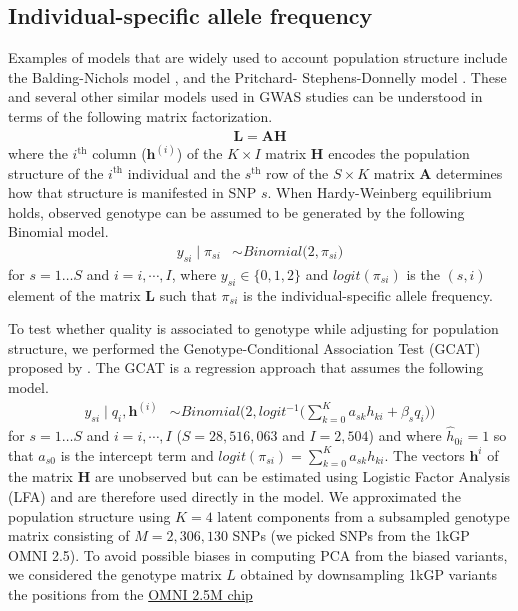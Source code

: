 \documentclass[9pt,lineno]{elife}
\begin{document}
\subsection{Individual-specific allele frequency}
Examples of models that are widely used to account population structure include the Balding-Nichols model \citep{balding1995method}, and the Pritchard- Stephens-Donnelly model \citep{pritchard2000inference}. 
These and several other similar models used in GWAS studies can be understood in terms of the following matrix factorization. 
\begin{align}
\mathbf{L }= \mathbf{AH}
\end{align} 
where the $i^\text{th}$ column ($\boldsymbol{h}^{(i)}$) of the $K \times I$ matrix $\mathbf{H}$ encodes the population structure of the $i^\text{th}$ individual and the $s^\text{th}$ row of the $S \times K$ matrix $\mathbf{A}$ determines how that structure is manifested in SNP $s$. 
When Hardy-Weinberg equilibrium holds, observed genotype can be assumed to be generated by the following Binomial model.
\begin{align} \label{lfa}
y_{si} \mid \pi_{si}  &\sim Binomial\big( 2, \pi_{si} \big) 
\end{align} 
for $s=1\hdots S$ and $i=i,\cdots, I$, where $y_{si} \in \{0,1,2\}$ and $logit(\pi_{si})$ is the $(s,i)$ element of the matrix $\mathbf{L}$ such that  $\pi_{si}$ is the individual-specific allele frequency.

To test whether quality is associated to genotype while adjusting for population structure, we performed the Genotype-Conditional Association Test  (GCAT) proposed by \citep{song2015testing}.
The GCAT is a regression approach that assumes the following model.
\begin{align}\label{gcat}
 y_{si} \mid q_i, \boldsymbol{h}^{(i)} &\sim Binomial\bigg( 2, logit^{-1}\Big( \sum_{k=0}^{K} a_{sk} h_{ki} + \beta_s q_i\Big) \bigg)
\end{align} 
for $s=1\hdots S$ and $i=i,\cdots, I$  ($S = 28,516,063$ and $I = 2,504$) and where $\hat{h}_{0i}=1$ so that $a_{s0}$ is the intercept term and $logit(\pi_{si})=\sum_{k=0}^{K} a_{sk} h_{ki}$. 
The vectors $\boldsymbol{h}^{i}$ of the matrix $\mathbf{H}$ are unobserved but can be estimated using Logistic Factor Analysis (LFA) \citep{song2015testing} and are therefore used directly in the model. 
We approximated the population structure using $K=4$ latent components from a subsampled genotype matrix consisting of $M = 2,306,130$ SNPs (we picked SNPs from the 1kGP OMNI 2.5). 
To avoid possible biases in computing PCA from the biased variants, we considered the genotype matrix $L$ obtained by downsampling 1kGP variants the positions from the \href{ftp://ftp.1000genomes.ebi.ac.uk/vol1/ftp/release/20130502/supporting/hd_genotype_chip/ALL.chip.omni_broad_sanger_combined.20140818.snps.genotypes.vcf.gz}{OMNI 2.5M chip}
\end{document}
